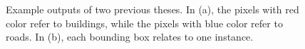 \begin{figure}[!h]
	\centering
    \caption[Example outputs of two previous theses]{Example outputs of two previous theses. In (a), the pixels with red color refer to buildings, while the pixels with blue color refer to roads. In (b), each bounding box relates to one instance.}
	\label{fig:prethe}
\end{figure}